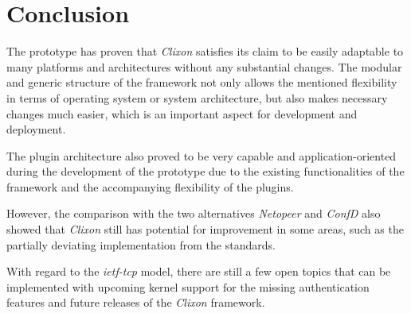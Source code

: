\section{Conclusion} 
\label{sec:conclusion}

The prototype has proven that \textit{Clixon} satisfies its claim to be easily adaptable to many platforms and architectures without any substantial changes.
The modular and generic structure of the framework not only allows the mentioned flexibility in terms of operating system or system architecture, but also makes necessary changes much easier, which is an important aspect for development and deployment.

The plugin architecture also proved to be very capable and application-oriented during the development of the prototype due to the existing functionalities of the framework and the accompanying flexibility of the plugins. 

However, the comparison with the two alternatives \textit{Netopeer} and \textit{ConfD} also showed that \textit{Clixon} still has potential for improvement in some areas, such as the partially deviating implementation from the standards.

With regard to the \textit{ietf-tcp} model, there are still a few open topics that can be implemented with upcoming kernel support for the missing authentication features and future releases of the \textit{Clixon} framework.